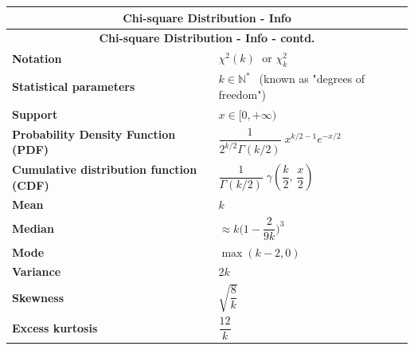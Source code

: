 \renewcommand{\arraystretch}{2}
\begin{longtable}{|m{6cm}|p{9cm}|}
    \hline
    \multicolumn{2}{|c|}{\textbf{Chi-square Distribution - Info} \cite{wiki/Chi-squared_distribution}} \\
    \hline\endfirsthead

    \hline
    \multicolumn{2}{|c|}{\textbf{Chi-square Distribution - Info - contd.} \cite{wiki/Chi-squared_distribution}} \\
    \hline\endhead
    
    \hline\endfoot
    \hline\endlastfoot

    \textbf{Notation} &
    ${\displaystyle \chi ^{2}(k)\;}$ or ${\displaystyle \chi _{k}^{2}\!}$
    \\ \hline

    \textbf{Statistical parameters} & 
    ${\displaystyle k\in \mathbb {N} ^{*}~~}$ (known as "degrees of freedom")
    \\ \hline
    
    \textbf{Support} &
    ${\displaystyle x\in [0,+\infty )\;}$
    \\ \hline

    \textbf{Probability Density Function (PDF)} & 
    ${\displaystyle {\dfrac {1}{2^{k/2}\Gamma (k/2)}}\;x^{k/2-1}e^{-x/2}\;}$
    \\[1ex] \hline
    
    \textbf{Cumulative distribution function (CDF)} & 
    ${\displaystyle {\dfrac {1}{\Gamma (k/2)}}\;\gamma \left({\dfrac {k}{2}},\,{\dfrac {x}{2}}\right)\;}$
    \\ \hline

    \textbf{Mean} & 
    $k$
    \\[1ex] \hline

    \textbf{Median} & 
    ${\displaystyle \approx k{\bigg (}1-{\dfrac {2}{9k}}{\bigg )}^{3}\;}$
    \\[1ex] \hline

    \textbf{Mode} & 
    ${\displaystyle \max(k-2,0)\;}$
    \\ \hline

    \textbf{Variance} &
    $2k$
    \\[1ex] \hline

    \textbf{Skewness} &
    ${\displaystyle {\sqrt {\dfrac{8}{k}}}\,}$
    \\[1ex] \hline

    \textbf{Excess kurtosis} &
    ${\displaystyle {\dfrac {12}{k}}}$
    \\[1ex] \hline


\end{longtable}
